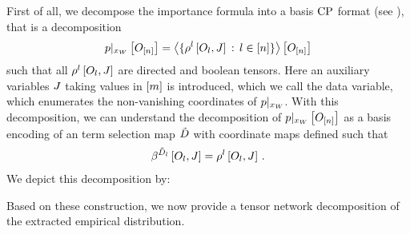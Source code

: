First of all, we decompose the importance formula into a basis $\mathrm{CP}$ format (see ), that is a decomposition
\begin{align*}
    {p}|_{x_{W}} \left[O_{[n]}\right]
    = \left\langle 
        \{\rho^{l}\left[O_{l},J\right] \,:\, l\in[n] \}
    \right\rangle \left[ O_{[n]} \right]
\end{align*}
such that all $\rho^{l}\left[O_{l},J\right]$ are directed and boolean tensors.
Here an auxiliary variables $J$ taking values in $[m]$ is introduced, which we call the data variable, which enumerates the non-vanishing coordinates of ${p}|_{x_{W}}$.
With this decomposition, we can understand the decomposition of ${p}|_{x_{W}} \left[O_{[n]}\right]$ as a basis encoding of an term selection map $\tilde{D}$ with coordinate maps defined such that
\begin{align*}
    \beta^{\tilde{D}_{l}}\left[O_{l},J\right]
    = \rho^{l}\left[O_{l},J\right] \, .
\end{align*}
We depict this decomposition by:
\begin{center}
    
\end{center}

Based on these construction, we now provide a tensor network decomposition of the extracted empirical distribution.

